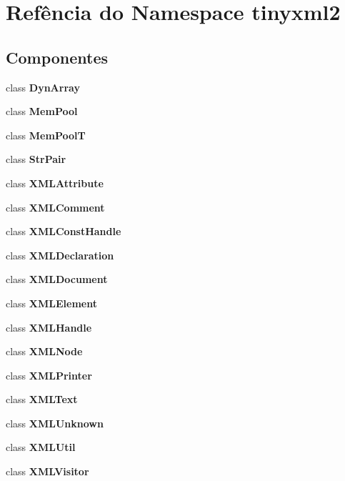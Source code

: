 \section{Refência do Namespace tinyxml2}
\label{namespacetinyxml2}
\subsection*{Componentes}
\begin{DoxyCompactItemize}
\item 
class {\bf Dyn\+Array}
\item 
class {\bf Mem\+Pool}
\item 
class {\bf Mem\+PoolT}
\item 
class {\bf Str\+Pair}
\item 
class {\bf X\+M\+L\+Attribute}
\item 
class {\bf X\+M\+L\+Comment}
\item 
class {\bf X\+M\+L\+Const\+Handle}
\item 
class {\bf X\+M\+L\+Declaration}
\item 
class {\bf X\+M\+L\+Document}
\item 
class {\bf X\+M\+L\+Element}
\item 
class {\bf X\+M\+L\+Handle}
\item 
class {\bf X\+M\+L\+Node}
\item 
class {\bf X\+M\+L\+Printer}
\item 
class {\bf X\+M\+L\+Text}
\item 
class {\bf X\+M\+L\+Unknown}
\item 
class {\bf X\+M\+L\+Util}
\item 
class {\bf X\+M\+L\+Visitor}
\end{DoxyCompactItemize}

